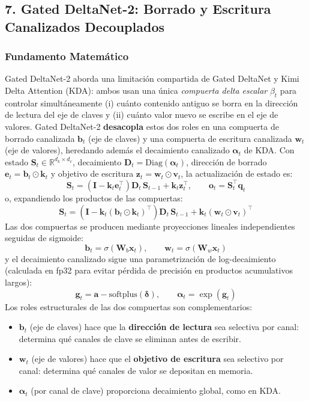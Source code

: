 \documentclass[11pt,a4paper]{article}
\begin{document}
\normalsize

\subsection{7. Gated DeltaNet-2: Borrado y Escritura Canalizados Decouplados}

\subsubsection{Fundamento Matemático}

Gated DeltaNet-2 \citep{hatamizadeh_gated_deltanet2_2026} aborda una limitación compartida de Gated DeltaNet y Kimi Delta Attention (KDA): ambos usan una única \emph{compuerta delta escalar} $\beta_t$ para controlar simultáneamente (i) cuánto contenido antiguo se borra en la dirección de lectura del eje de claves y (ii) cuánto valor nuevo se escribe en el eje de valores. Gated DeltaNet-2 \textbf{desacopla} estos dos roles en una compuerta de borrado canalizada $\mathbf{b}_t$ (eje de claves) y una compuerta de escritura canalizada $\mathbf{w}_t$ (eje de valores), heredando además el decaimiento canalizado $\boldsymbol{\alpha}_t$ de KDA. Con estado $\mathbf{S}_t \in \mathbb{R}^{d_k \times d_v}$, decaimiento $\mathbf{D}_t = \mathrm{Diag}(\boldsymbol{\alpha}_t)$, dirección de borrado $\mathbf{e}_t = \mathbf{b}_t \odot \mathbf{k}_t$ y objetivo de escritura $\mathbf{z}_t = \mathbf{w}_t \odot \mathbf{v}_t$, la actualización de estado es:
\[
\mathbf{S}_t = \left(\mathbf{I} - \mathbf{k}_t \mathbf{e}_t^\top\right) \mathbf{D}_t \, \mathbf{S}_{t-1} + \mathbf{k}_t \mathbf{z}_t^\top, \qquad \mathbf{o}_t = \mathbf{S}_t^\top \mathbf{q}_t
\]
o, expandiendo los productos de las compuertas:
\[
\mathbf{S}_t = \left(\mathbf{I} - \mathbf{k}_t (\mathbf{b}_t \odot \mathbf{k}_t)^\top\right) \mathbf{D}_t \, \mathbf{S}_{t-1} + \mathbf{k}_t (\mathbf{w}_t \odot \mathbf{v}_t)^\top
\]
Las dos compuertas se producen mediante proyecciones lineales independientes seguidas de sigmoide:
\[
\mathbf{b}_t = \sigma(\mathbf{W}_b \mathbf{x}_t), \qquad \mathbf{w}_t = \sigma(\mathbf{W}_w \mathbf{x}_t)
\]
y el decaimiento canalizado sigue una parametrización de log-decaimiento (calculada en fp32 para evitar pérdida de precisión en productos acumulativos largos):
\[
\mathbf{g}_t = \mathbf{a} - \mathrm{softplus}(\boldsymbol{\delta}), \qquad \boldsymbol{\alpha}_t = \exp(\mathbf{g}_t)
\]
Los roles estructurales de las dos compuertas son complementarios:
\begin{itemize}[leftmargin=*]
    \item $\mathbf{b}_t$ (eje de claves) hace que la \textbf{dirección de lectura} sea selectiva por canal: determina qué canales de clave se eliminan antes de escribir.
    \item $\mathbf{w}_t$ (eje de valores) hace que el \textbf{objetivo de escritura} sea selectivo por canal: determina qué canales de valor se depositan en memoria.
    \item $\boldsymbol{\alpha}_t$ (por canal de clave) proporciona decaimiento global, como en KDA.
\end{itemize}
\end{document}
